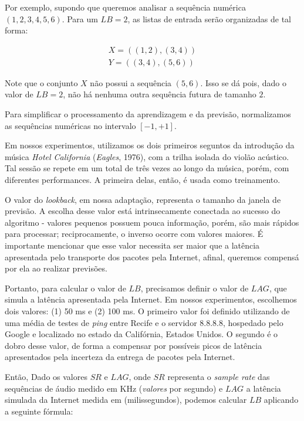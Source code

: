 Por exemplo, supondo que queremos analisar a sequência numérica $(1, 2, 3, 4, 5, 6)$. Para um $LB = 2$, as listas de entrada serão organizadas de tal forma:

\begin{equation}
\begin{split}
    X = ((1, 2), (3, 4)) \\
    Y = ((3, 4), (5, 6))
\end{split}
\end{equation}

Note que o conjunto $X$ não possui a sequência $(5,6)$. Isso se dá pois, dado o valor de $LB = 2$, não há nenhuma outra sequência futura de tamanho $2$.

Para simplificar o processamento da aprendizagem e da previsão, normalizamos as sequências numéricas no intervalo $[-1, +1]$.

Em nossos experimentos, utilizamos os dois primeiros seguntos da introdução da música \textit{Hotel California} (\textit{Eagles}, 1976), com a trilha isolada do violão acústico. Tal sessão se repete em um total de três vezes ao longo da música, porém, com diferentes performances. A primeira delas, então, é usada como treinamento.

O valor do \textit{lookback}, em nossa adaptação, representa o tamanho da janela de previsão. A escolha desse valor está intrinsecamente conectada ao sucesso do algoritmo - valores pequenos possuem pouca informação, porém, são mais rápidos para processar; reciprocamente, o inverso ocorre com valores maiores. É importante mencionar que esse valor necessita ser maior que a latência apresentada pelo transporte dos pacotes pela Internet, afinal, queremos compensá por ela ao realizar previsões.

Portanto, para calcular o valor de $LB$, precisamos definir o valor de $LAG$, que simula a latência apresentada pela Internet. Em nossos experimentos, escolhemos dois valores: (1) 50 ms e (2) 100 ms. O primeiro valor foi definido utilizando de uma média de testes de \textit{ping} entre Recife e o servidor 8.8.8.8, hospedado pelo Google e localizado no estado da Califórnia, Estados Unidos. O segundo é o dobro desse valor, de forma a compensar por possíveis picos de latência apresentados pela incerteza da entrega de pacotes pela Internet.

Então, Dado os valores $SR$ e $LAG$, onde $SR$ representa o \textit{sample rate} das sequências de áudio medido em KHz (\textit{valores} por segundo) e $LAG$ a latência simulada da Internet medida em (milissegundos), podemos calcular $LB$ aplicando a seguinte fórmula:

